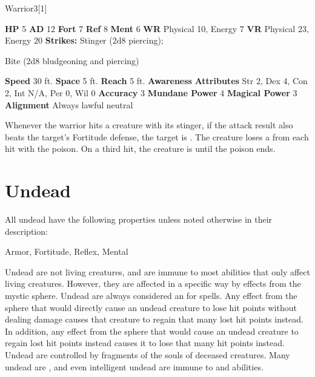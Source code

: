 {{\begin{monsubsection}{Warrior}{3}[1]
    \begin{spellcontent}
      \begin{spelltargetinginfo}
        \pari \textbf{HP} 5 \monsep
          \textbf{AD} 12 \monsep
          \textbf{Fort} 7 \monsep
          \textbf{Ref} 8 \monsep
          \textbf{Ment} 6
        \pari \textbf{WR} Physical 10, Energy 7 \monsep
        \textbf{VR} Physical 23, Energy 20
        \pari \textbf{Strikes:}
            Stinger  (2d8 piercing);
\par Bite  (2d8 bludgeoning and piercing)
      \end{spelltargetinginfo}
    \end{spellcontent}
    \begin{monsterfooter}
      \pari \textbf{Speed} 30 ft. \monsep
        \textbf{Space} 5 ft. \monsep
        \textbf{Reach} 5 ft.
      \pari \textbf{Awareness} 
      \pari \textbf{Attributes}
        Str 2, Dex 4,
        Con 2, Int N/A,
        Per 0, Wil 0
      \pari \textbf{Accuracy} 3 \monsep
        \textbf{Mundane Power} 4 \monsep
      \textbf{Magical Power} 3
      \pari \textbf{Alignment} Always lawful neutral
    \end{monsterfooter}
  \end{monsubsection}
            Whenever the warrior hits a creature with its stinger, if the attack result also beats the target's Fortitude defense, the target is .
            The creature loses a  from each hit with the poison.
            On a third hit, the creature is  until the poison ends.
  
  
        \section{Undead}

        All undead have the following properties unless noted otherwise in their description:
        
    
     Armor,
     Fortitude,
     Reflex,
     Mental
  
     Undead are not living creatures, and are immune to most abilities that only affect living creatures.
    However, they are affected in a specific way by effects from the  mystic sphere.
    Undead are always considered an  for  spells.
    Any effect from the  sphere that would directly cause an undead creature to lose hit points without dealing damage causes that creature to regain that many lost hit points instead.
    In addition, any effect from the  sphere that would cause an undead creature to regain lost hit points instead causes it to lose that many hit points instead.
     Undead are controlled by fragments of the souls of deceased creatures.
    Many undead are , and even intelligent undead are immune to  and  abilities.
  
}}
